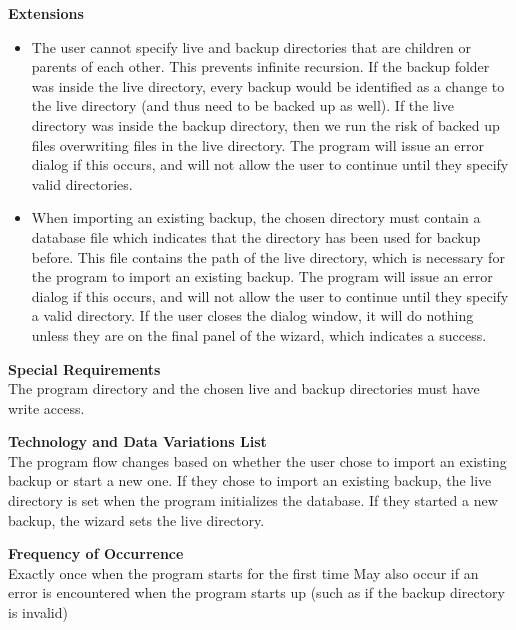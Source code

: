 \documentclass[12pt,a4paper]{article}
\begin{document}
\begin{description}
	\item \textbf{Extensions} \\
	\begin{itemize}
		\item The user cannot specify live and backup directories that are children or parents of each other. 
				This prevents infinite recursion. If the backup folder was inside the live directory, every backup would be identified as a change to the live directory (and thus need to be backed up as well). If the live directory was inside the backup directory, then we 					run the risk of backed up files overwriting files in the live directory. 
				The program will issue an error dialog if this occurs, and will not allow the user to continue until they specify valid directories. 
		\item When importing an existing backup, the chosen directory must contain a database file which indicates that the directory has been used for backup before. 
				This file contains the path of the live directory, which is necessary for the program to import an existing backup. 
				The program will issue an error dialog if this occurs, and will not allow the user to continue until they specify a valid directory. 
				If the user closes the dialog window, it will do nothing unless they are on the final panel of the wizard, which indicates a success. 
	\end{itemize}
	\item \textbf{Special Requirements}\\
		The program directory and the chosen live and backup directories must have write access.
	\item \textbf{Technology and Data Variations List}\\
		The program flow changes based on whether the user chose to import an existing backup or start a new one. If they chose to import an existing backup, the live directory is set when the program initializes the database. If they started a new backup, the wizard sets 		the live directory.
	\item \textbf{Frequency of Occurrence}\\
		Exactly once when the program starts for the first time 
		May also occur if an error is encountered when the program starts up (such as if the backup directory is invalid) 
\end{description}
\end{document}

